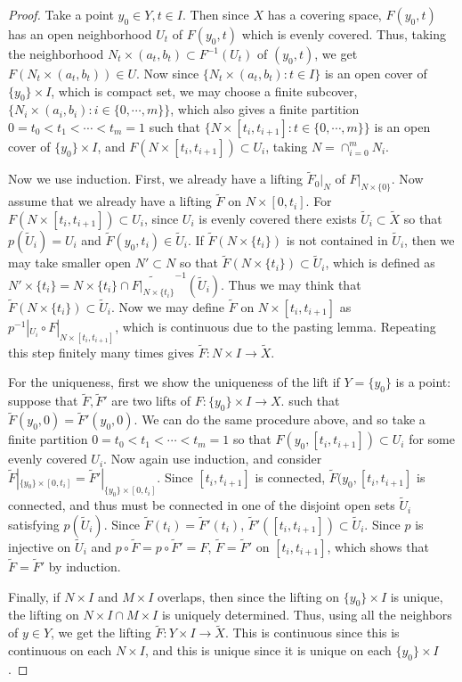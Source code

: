 \begin{proof} Take a point $y_0\in Y, t\in I$. Then since $X$ has a covering space, $F(y_0,t)$ has an open neighborhood $U_{t}$ of $F(y_0,t)$ which is evenly covered. Thus, taking the neighborhood $N_t\times (a_t,b_t)\subset F^{-1}(U_t)$ of $(y_0,t)$, we get $F(N_t\times (a_t,b_t))\in U$. Now since $\{N_t\times (a_t,b_t):t\in I\}$ is an open cover of $\{y_0\}\times I$, which is compact set, we may choose a finite subcover, $\{N_i\times (a_i,b_i):i\in \{0,\cdots,m\}\}$, which also gives a finite partition $0=t_0<t_1<\cdots<t_m=1$ such that $\{N\times [t_i,t_{i+1}]:t\in\{0,\cdots,m\}\}$ is an open cover of $\{y_0\}\times I$, and $F(N\times [t_i,t_{i+1}])\subset U_i$, taking $N=\cap_{i=0}^m N_i$.

Now we use induction. First, we already have a lifting $\tilde{F}_0|_N$ of $F|_{N\times \{0\}}$. Now assume that we already have a lifting $\tilde{F}$ on $N\times [0,t_{i}]$. For $F(N\times [t_i,t_{i+1}])\subset U_i$, since $U_i$ is evenly covered there exists $\tilde{U}_i\subset \tilde{X}$ so that $p(\tilde{U}_i)=U_i$ and $\tilde{F}(y_0,t_i)\in \tilde{U}_i$. If $\tilde{F}(N\times \{t_i\})$ is not contained in $\tilde{U}_i$, then we may take smaller open $N'\subset N$ so that $\tilde{F}(N\times \{t_i\})\subset \tilde{U}_i$, which is defined as $N'\times \{t_i\}=N\times \{t_i\}\cap \tilde{F|_{N\times \{t_i\}}}^{-1}(\tilde{U}_i)$. Thus we may think that $\tilde{F}(N\times \{t_i\})\subset \tilde{U}_i$. Now we may define $\tilde{F}$ on $N\times [t_i,t_{i+1}]$ as $p^{-1}|_{U_i}\circ F|_{N\times [t_i,t_{i+1}]}$, which is continuous due to the pasting lemma. Repeating this step finitely many times gives $\tilde{F}:N\times I\rightarrow \tilde{X}$.

For the uniqueness, first we show the uniqueness of the lift if $Y=\{y_0\}$ is a point: suppose that $\tilde{F},\tilde{F}'$ are two lifts of $F:\{y_0\}\times I\rightarrow X$. such that $\tilde{F}(y_0,0)=\tilde{F}'(y_0,0)$. We can do the same procedure above, and so take a finite partition $0=t_0<t_1<\cdots<t_m=1$ so that $F(y_0,[t_i,t_{i+1}])\subset U_i$ for some evenly covered $U_i$. Now again use induction, and consider $\tilde{F}|_{\{y_0\}\times [0,t_i]}=\tilde{F}'|_{\{y_0\}\times [0,t_i]}$. Since $[t_i,t_{i+1}]$ is connected, $\tilde{F}(y_0,[t_i,t_{i+1}]$ is connected, and thus must be connected in one of the disjoint open sets $\tilde{U}_i$ satisfying $p(\tilde{U}_i)$. Since $\tilde{F}(t_i)=\tilde{F}'(t_i)$, $\tilde{F}'([t_i,t_{i+1}])\subset \tilde{U}_i$. Since $p$ is injective on $\tilde{U}_i$ and $p\circ \tilde{F}=p\circ \tilde{F}'=F$, $\tilde{F}=\tilde{F}'$ on $[t_i,t_{i+1}]$, which shows that $\tilde{F}=\tilde{F}'$ by induction.

Finally, if $N\times I$ and $M\times I$ overlaps, then since the lifting on $\{y_0\}\times I$ is unique, the lifting on $N\times I\cap M\times I$ is uniquely determined. Thus, using all the neighbors of $y\in Y$, we get the lifting $\tilde{F}:Y\times I\rightarrow \tilde{X}$. This is continuous since this is continuous on each $N\times I$, and this is unique since it is unique on each $\{y_0\}\times I$.
\end{proof}
